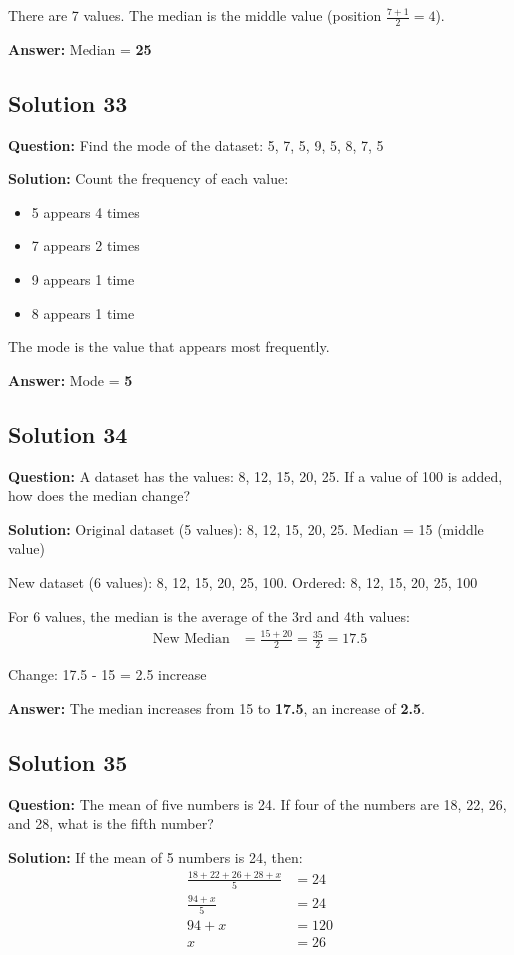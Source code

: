 \documentclass[12pt,a4paper]{article}
\begin{document}
There are 7 values. The median is the middle value (position $\frac{7+1}{2} = 4$).

\textbf{Answer:} Median = \textbf{25}

\subsection*{Solution 33}
\textbf{Question:} Find the mode of the dataset: 5, 7, 5, 9, 5, 8, 7, 5

\textbf{Solution:} Count the frequency of each value:
\begin{itemize}
    \item 5 appears 4 times
    \item 7 appears 2 times
    \item 9 appears 1 time
    \item 8 appears 1 time
\end{itemize}

The mode is the value that appears most frequently.

\textbf{Answer:} Mode = \textbf{5}

\subsection*{Solution 34}
\textbf{Question:} A dataset has the values: 8, 12, 15, 20, 25. If a value of 100 is added, how does the median change?

\textbf{Solution:}
Original dataset (5 values): 8, 12, 15, 20, 25. Median = 15 (middle value)

New dataset (6 values): 8, 12, 15, 20, 25, 100. Ordered: 8, 12, 15, 20, 25, 100

For 6 values, the median is the average of the 3rd and 4th values:
\begin{align*}
\text{New Median} &= \frac{15 + 20}{2} = \frac{35}{2} = 17.5
\end{align*}

Change: 17.5 - 15 = 2.5 increase

\textbf{Answer:} The median increases from 15 to \textbf{17.5}, an increase of \textbf{2.5}.

\subsection*{Solution 35}
\textbf{Question:} The mean of five numbers is 24. If four of the numbers are 18, 22, 26, and 28, what is the fifth number?

\textbf{Solution:} If the mean of 5 numbers is 24, then:
\begin{align*}
\frac{18 + 22 + 26 + 28 + x}{5} &= 24 \\
\frac{94 + x}{5} &= 24 \\
94 + x &= 120 \\
x &= 26
\end{align*}
\end{document}
